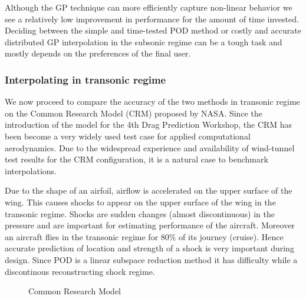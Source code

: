Although the GP technique can more efficiently capture non-linear behavior we see a relatively low improvement in performance for the amount of time invested. Deciding between the simple and time-tested POD method or costly and accurate distributed GP interpolation in the subsonic regime can be a tough task and mostly depends on the preferences of the final user.

\subsubsection{Interpolating in transonic regime}\label{subSec:resultsCRM}
We now proceed to compare the accuracy of the two methods in transonic regime on the Common Research Model (CRM)  proposed by NASA. Since the introduction of the model for the 4th Drag Prediction Workshop, the CRM has been become a very widely used test case for applied computational aerodynamics. Due to the widespread experience and availability of wind-tunnel test results for the CRM configuration, it is a natural case to benchmark interpolations. 

Due to the shape of an airfoil, airflow is accelerated on the upper surface of the wing. This causes shocks to appear on the upper surface of the wing in the transonic regime. Shocks are sudden changes (almost discontinuous) in the pressure and are important for estimating performance of the aircraft. Moreover an aircraft flies in the transonic regime for 80\% of its journey (cruise). Hence accurate prediction of location and strength of a shock is very important during design. Since POD is a linear subspace reduction method it has difficulty while a discontinous reconstructing shock regime.

\begin{figure}[!ht]
  \centering
  \quad
  \caption{Common Research Model}
\end{figure}

